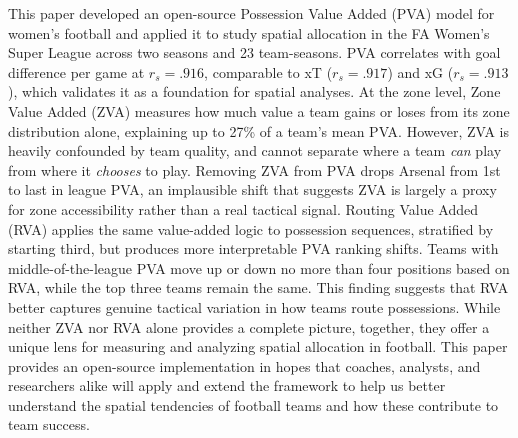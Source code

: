 \documentclass[12pt,a4paper]{article}
\begin{document}
This paper developed an open-source Possession Value Added (PVA) model for women’s football and applied it to study spatial allocation in the FA Women’s Super League across two seasons and 23 team-seasons. PVA correlates with goal difference per game at $r_s = .916$, comparable to xT ($r_s = .917$) and xG ($r_s = .913$), which validates it as a foundation for spatial analyses. At the zone level, Zone Value Added (ZVA) measures how much value a team gains or loses from its zone distribution alone, explaining up to 27\% of a team’s mean PVA. However, ZVA is heavily confounded by team quality, and cannot separate where a team \emph{can} play from where it \emph{chooses} to play. Removing ZVA from PVA drops Arsenal from 1st to last in league PVA, an implausible shift that suggests ZVA is largely a proxy for zone accessibility rather than a real tactical signal. Routing Value Added (RVA) applies the same value-added logic to possession sequences, stratified by starting third, but produces more interpretable PVA ranking shifts. Teams with middle-of-the-league PVA move up or down no more than four positions based on RVA, while the top three teams remain the same. This finding suggests that RVA better captures genuine tactical variation in how teams route possessions. While neither ZVA nor RVA alone provides a complete picture, together, they offer a unique lens for measuring and analyzing spatial allocation in football. This paper provides an open-source implementation in hopes that coaches, analysts, and researchers alike will apply and extend the framework to help us better understand the spatial tendencies of football teams and how these contribute to team success.
\end{document}
